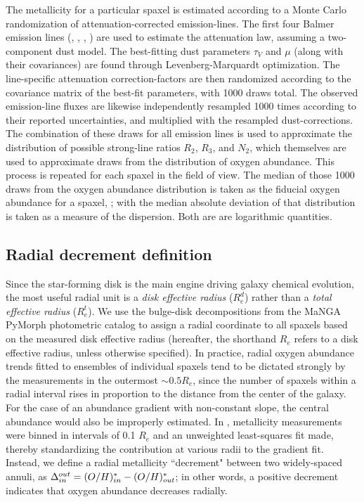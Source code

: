 The metallicity for a particular spaxel is estimated according to a Monte Carlo randomization of attenuation-corrected emission-lines. The first four Balmer emission lines (\ha, \hb, \hg, \hd) are used to estimate the attenuation law, assuming a \citet{charlot_fall_00} two-component dust model. The best-fitting dust parameters $\tau_V$ and $\mu$ (along with their covariances) are found through Levenberg-Marquardt optimization. The line-specific attenuation correction-factors are then randomized according to the covariance matrix of the best-fit parameters, with 1000 draws total. The observed emission-line fluxes are likewise independently resampled 1000 times according to their reported uncertainties, and multiplied with the resampled dust-corrections. The combination of these draws for all emission lines is used to approximate the distribution of possible strong-line ratios $R_2$, $R_3$, and $N_2$, which themselves are used to approximate draws from the distribution of oxygen abundance. This process is repeated for each spaxel in the field of view. The median of those 1000 draws from the oxygen abundance distribution is taken as the fiducial oxygen abundance for a spaxel, \met; with the median absolute deviation of that distribution is taken as a measure of the dispersion. Both are are logarithmic quantities.

\subsection{Radial decrement definition}
\label{subsec:bintervals}

Since the star-forming disk is the main engine driving galaxy chemical evolution, the most useful radial unit is a \emph{disk effective radius} ($R_e^d$) rather than a \emph{total effective radius} ($R_e^t$). We use the bulge-disk decompositions from the MaNGA PyMorph photometric catalog \citep{fischer_2019_pymorph} to assign a radial coordinate to all spaxels based on the measured disk effective radius (hereafter, the shorthand $R_e$ refers to a disk effective radius, unless otherwise specified). In practice, radial oxygen abundance trends fitted to ensembles of individual spaxels tend to be dictated strongly by the measurements in the outermost $\sim 0.5 R_e$, since the number of spaxels within a radial interval rises in proportion to the distance from the center of the galaxy. For the case of an abundance gradient with non-constant slope, the central abundance would also be improperly estimated. In \citet{belfiore_2017_manga-metgrad}, metallicity measurements were binned in intervals of 0.1 $R_e$ and an unweighted least-squares fit made, thereby standardizing the contribution at various radii to the gradient fit. Instead, we define a radial metallicity ``decrement" between two widely-spaced annuli, as $\Delta_{in}^{out} = (O/H)^*_{in} - (O/H)^*_{out}$; in other words, a positive decrement indicates that oxygen abundance decreases radially.

